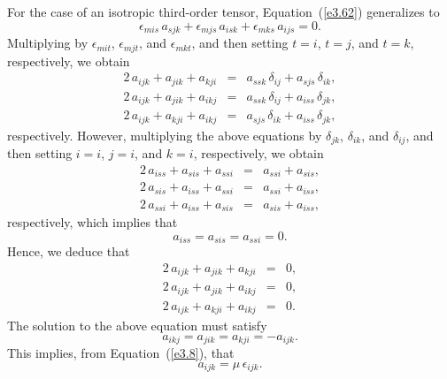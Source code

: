 For the case of an isotropic third-order tensor, Equation~(\ref{e3.62}) generalizes to
\begin{equation}\label{e3.68}
\epsilon_{mis}\,a_{sjk} + \epsilon_{mjs}\,a_{isk}+\epsilon_{mks}\,a_{ijs}=0.
\end{equation}
Multiplying by $\epsilon_{mit}$,  $\epsilon_{mjt}$, and $\epsilon_{mkt}$, and then
setting $t=i$, $t=j$, and $t=k$, respectively, we obtain
\begin{eqnarray}
2\,a_{ijk} + a_{jik} + a_{kji} &=&a_{ssk}\,\delta_{ij} + a_{sjs}\,\delta_{ik},\\[0.5ex]
2\,a_{ijk} + a_{jik} + a_{ikj} &=& a_{ssk}\,\delta_{ij} + a_{iss}\,\delta_{jk},\\[0.5ex]
2\,a_{ijk} +a_{kji} +a_{ikj} &=&a_{sjs}\,\delta_{ik} + a_{iss}\,\delta_{jk},
\end{eqnarray}
respectively. However, multiplying the above equations by $\delta_{jk}$, $\delta_{ik}$, and $\delta_{ij}$, and
then setting $i=i$, $j=i$, and $k=i$, respectively, we
obtain
\begin{eqnarray}
2\,a_{iss} + a_{sis} + a_{ssi} &=&a_{ssi}+a_{sis},\\[0.5ex]
2\,a_{sis} + a_{iss} + a_{ssi} &=& a_{ssi}+a_{iss},\\[0.5ex]
2\,a_{ssi} +a_{iss} +a_{sis} &=&a_{sis} + a_{iss},
\end{eqnarray}
respectively,
which implies that
\begin{equation}
a_{iss}=a_{sis}= a_{ssi} = 0.
\end{equation}
Hence, we deduce that
\begin{eqnarray}
2\,a_{ijk} + a_{jik} + a_{kji} &=&0,\\[0.5ex]
2\,a_{ijk} + a_{jik} + a_{ikj} &=& 0,\\[0.5ex]
2\,a_{ijk} +a_{kji} +a_{ikj} &=&0.
\end{eqnarray}
The solution to the above equation must satisfy
\begin{equation}
a_{ikj} = a_{jik}=a_{kji} = -a_{ijk}.
\end{equation}
This implies, from Equation~(\ref{e3.8}), that
\begin{equation}
a_{ijk} = \mu\,\epsilon_{ijk}.
\end{equation}

